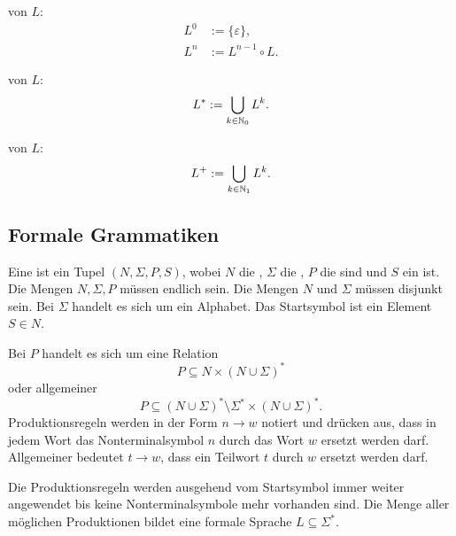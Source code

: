 \begin{definition}\mbox{}\newline
{} von $L$:
\begin{align}
L^0 &:= \{\varepsilon\},\\
L^n &:= L^{n-1}\circ L.
\end{align}
\end{definition}

\begin{definition}\mbox{}\newline
{} von $L$:
\begin{equation}
L^* := \bigcup_{k\in\mathbb N_0} L^k.
\end{equation}

 von $L$:
\begin{equation}
L^+ := \bigcup_{k\in\mathbb N_1} L^k.
\end{equation}
\end{definition}

\subsection{Formale Grammatiken}
\begin{definition}\mbox{}\newline
Eine  ist ein Tupel $(N,\Sigma,P,S)$,
wobei $N$ die ,
$\Sigma$ die ,
$P$ die  sind
und $S$ ein  ist.
Die Mengen $N,\Sigma,P$ müssen endlich sein. Die Mengen $N$ und
$\Sigma$ müssen disjunkt sein. Bei $\Sigma$ handelt es sich um
ein Alphabet. Das Startsymbol ist ein Element $S\in N$.

Bei $P$ handelt es sich um eine Relation
\begin{equation}\label{eq:einfache-Produktionsregeln}
P\subseteq N\times (N\cup\Sigma)^*
\end{equation}
oder allgemeiner
\begin{equation}
P\subseteq (N\cup\Sigma)^*\setminus\Sigma^*\times (N\cup\Sigma)^*.
\end{equation}
Produktionsregeln werden in der Form $n\to w$ notiert und drücken aus,
dass in jedem Wort das Nonterminalsymbol $n$ durch das Wort $w$ ersetzt
werden darf. Allgemeiner bedeutet $t\to w$, dass ein Teilwort $t$
durch $w$ ersetzt werden darf.

Die Produktionsregeln werden ausgehend vom Startsymbol immer weiter
angewendet bis keine Nonterminalsymbole mehr vorhanden sind.
Die Menge aller möglichen Produktionen bildet
eine formale Sprache $L\subseteq\Sigma^*$.
\end{definition}

